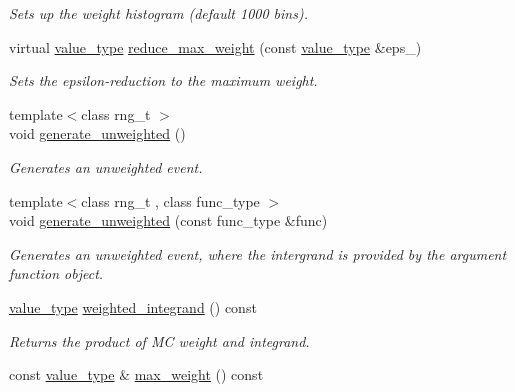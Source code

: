 \begin{DoxyCompactItemize}
\begin{DoxyCompactList}\small\item\em Sets up the weight histogram (default 1000 bins). \end{DoxyCompactList}\item 
\hypertarget{a00369_a710cc24f4e19e6fb3494302cfc1e36c2}{}virtual \hyperlink{a00369_a06caf6de1272e36a9281c3db764e6f16}{value\+\_\+type} \hyperlink{a00369_a710cc24f4e19e6fb3494302cfc1e36c2}{reduce\+\_\+max\+\_\+weight} (const \hyperlink{a00369_a06caf6de1272e36a9281c3db764e6f16}{value\+\_\+type} \&eps\+\_\+)\label{a00369_a710cc24f4e19e6fb3494302cfc1e36c2}

\begin{DoxyCompactList}\small\item\em Sets the epsilon-\/reduction to the maximum weight. \end{DoxyCompactList}\item 
{\footnotesize template$<$class rng\+\_\+t $>$ }\\void \hyperlink{a00369_a50e23be43c71a573319bed83142c2d29}{generate\+\_\+unweighted} ()
\begin{DoxyCompactList}\small\item\em Generates an unweighted event. \end{DoxyCompactList}\item 
{\footnotesize template$<$class rng\+\_\+t , class func\+\_\+type $>$ }\\void \hyperlink{a00369_ac091c0357306e9742488e497bb7517fa}{generate\+\_\+unweighted} (const func\+\_\+type \&func)
\begin{DoxyCompactList}\small\item\em Generates an unweighted event, where the intergrand is provided by the argument function object. \end{DoxyCompactList}\item 
\hypertarget{a00369_afa827e605dd4eff759964a7ca33c8966}{}\hyperlink{a00369_a06caf6de1272e36a9281c3db764e6f16}{value\+\_\+type} \hyperlink{a00369_afa827e605dd4eff759964a7ca33c8966}{weighted\+\_\+integrand} () const \label{a00369_afa827e605dd4eff759964a7ca33c8966}

\begin{DoxyCompactList}\small\item\em Returns the product of M\+C weight and integrand. \end{DoxyCompactList}\item 
\hypertarget{a00369_a14aafe1745e47c5f3f4cd8dc2551d58c}{}const \hyperlink{a00369_a06caf6de1272e36a9281c3db764e6f16}{value\+\_\+type} \& \hyperlink{a00369_a14aafe1745e47c5f3f4cd8dc2551d58c}{max\+\_\+weight} () const \label{a00369_a14aafe1745e47c5f3f4cd8dc2551d58c}


\end{DoxyCompactItemize}

